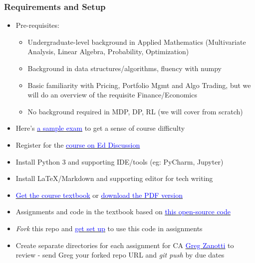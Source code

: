 \documentclass[handout]{beamer}
\begin{document}
\begin{frame}
\frametitle{Requirements and Setup}
\pause
\begin{itemize}[<+->]
\item Pre-requisites:
\begin{itemize}
\item Undergraduate-level background in Applied Mathematics (Multivariate Analysis, Linear Algebra, Probability, Optimization)
\item Background in data structures/algorithms, fluency with numpy
\item Basic familiarity with Pricing, Portfolio Mgmt and Algo Trading, but we will do an overview of the requisite Finance/Economics
\item No background required in MDP, DP, RL (we will cover from scratch)
\end{itemize}
\item Here's \href{https://colab.research.google.com/drive/1DVu4IggqmqpfWzT706llabiQY2UnP951?usp=sharing}{\underline{\textcolor{blue}{a sample exam}}}  to get a sense of course difficulty
\item Register for the \href{https://edstem.org/us/courses/49954}{\underline{\textcolor{blue}{course on Ed Discussion}}}
\item Install Python 3 and supporting IDE/tools (eg: PyCharm, Jupyter)
\item Install LaTeX/Markdown and supporting editor for tech writing
\item \href{https://www.amazon.com/Foundations-Reinforcement-Learning-Applications-Finance-ebook/dp/B0BJTR8D5L}{\underline{\textcolor{blue}{Get the course textbook}}} or \href{https://stanford.edu/~ashlearn/RLForFinanceBook/book.pdf}{\underline{\textcolor{blue}{download the PDF version}}}
\item Assignments and code in the textbook based on \href{https://github.com/TikhonJelvis/RL-Book}{\underline{\textcolor{blue}{this open-source code}}}
\item {\em Fork} this repo and \href{http://web.stanford.edu/class/cme241/lecture_slides/assignments/assignment1.pdf}{\underline{\textcolor{blue}{get set up}}} to use this code in assignments
\item Create separate directories for each assignment for CA \href{mailto:gzanotti@stanford.edu}{\underline{\textcolor{blue}{Greg Zanotti}}} to review - send Greg your forked repo URL and {\em git push} by due dates
\end{itemize}
\end{frame}
\end{document}
